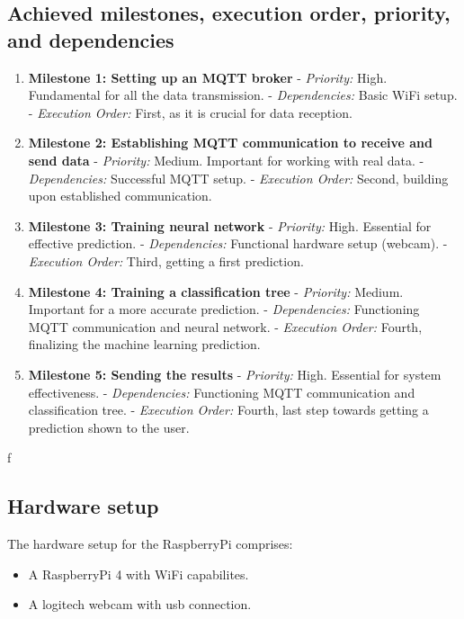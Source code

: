 \documentclass{article}
\begin{document}
\subsection{Achieved milestones, execution order, priority, and dependencies}
\begin{enumerate}
    \item \textbf{Milestone 1: Setting up an MQTT broker}
       - \textit{Priority:} High. Fundamental for all the data transmission.
       - \textit{Dependencies:} Basic WiFi setup.
       - \textit{Execution Order:} First, as it is crucial for data reception.

    \item \textbf{Milestone 2: Establishing MQTT communication to receive and send data}
       - \textit{Priority:} Medium. Important for working with real data.
       - \textit{Dependencies:} Successful MQTT setup.
       - \textit{Execution Order:} Second, building upon established communication.

    \item \textbf{Milestone 3: Training neural network}
       - \textit{Priority:} High. Essential for effective prediction.
       - \textit{Dependencies:} Functional hardware setup (webcam).
       - \textit{Execution Order:} Third, getting a first prediction.

    \item \textbf{Milestone 4: Training a classification tree}
       - \textit{Priority:} Medium. Important for a more accurate prediction.
       - \textit{Dependencies:} Functioning MQTT communication and neural network.
       - \textit{Execution Order:} Fourth, finalizing the machine learning prediction.

    \item \textbf{Milestone 5: Sending the results}
       - \textit{Priority:} High. Essential for system effectiveness.
       - \textit{Dependencies:} Functioning MQTT communication and classification tree.
       - \textit{Execution Order:} Fourth, last step towards getting a prediction shown to the user.
\end{enumerate}ƒ

\subsection{Hardware setup}
The hardware setup for the RaspberryPi comprises:
\begin{itemize}
    \item A RaspberryPi 4 with WiFi capabilites.
    \item A logitech webcam with usb connection.
\end{itemize}
\end{document}
